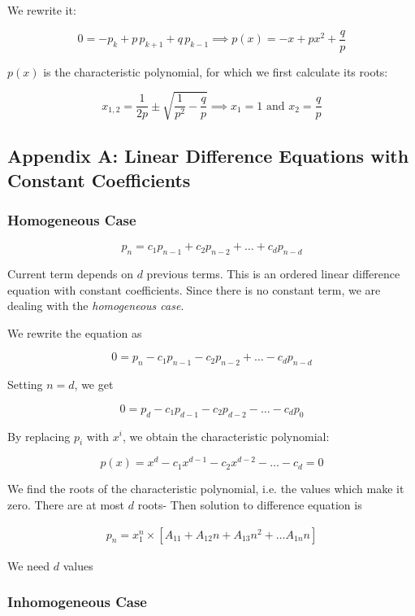 \documentclass{article}
\theoremstyle{definition}
\begin{document}
We rewrite it: 

$$
0 = -p_k + p \, p_{k+1} + q \, p_{k-1} \implies p(x) = -x + px^2 + \frac{q}{p}
$$

$p(x)$ is the characteristic polynomial, for which we first calculate its roots:

$$
x_{1,2} = \frac{1}{2p} \pm \sqrt{\frac{1}{p^2} - \frac{q}{p}} \implies x_1 = 1 \text{ and } x_2 = \frac{q}{p}
$$

\subsection{Appendix A: Linear Difference Equations with Constant Coefficients}

\subsubsection{Homogeneous Case}

$$
p_n = c_1 p_{n-1} + c_2 p_{n-2} + \ldots + c_d p_{n-d}
$$

Current term depends on $d$ previous terms. This is an ordered linear difference equation with constant coefficients. Since there is no constant term, we are dealing with the \emph{homogeneous case}. 

We rewrite the equation as 

$$
0 = p_n - c_1 p_{n-1} - c_2 p_{n-2} + \ldots - c_d p_{n-d}
$$

Setting $n = d$, we get

$$
0 = p_d - c_1 p_{d-1} - c_2 p_{d-2} - \ldots - c_d p_{0}
$$

By replacing $p_i$ with $x^i$, we obtain the characteristic polynomial:

$$
p(x) = x^d - c_1 x^{d-1} - c_2 x^{d-2} - \ldots - c_d = 0
$$

We find the roots of the characteristic polynomial, i.e. the values which make it zero. There are at most $d$ roots- 
Then solution to difference equation is 

\begin{align*}
p_n =  x_1^n \times \left[ A_11 + A_12 n + A_13 n^2 + \ldots A_{1n} n \right]
\end{align*}

We need $d$ values

\subsubsection{Inhomogeneous Case}
\end{document}
